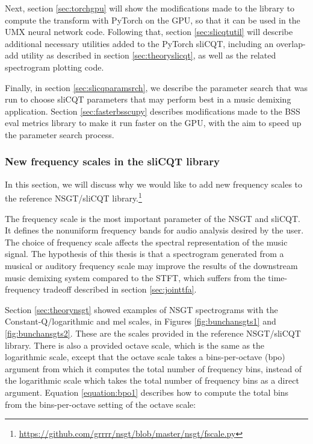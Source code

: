 \documentclass[report.tex]{subfiles}
\begin{document}
Next, section \ref{sec:torchgpu} will show the modifications made to the library to compute the transform with PyTorch on the GPU, so that it can be used in the UMX neural network code. Following that, section \ref{sec:slicqtutil} will describe additional necessary utilities added to the PyTorch sliCQT, including an overlap-add utility as described in section \ref{sec:theoryslicqt}, as well as the related spectrogram plotting code.

Finally, in section \ref{sec:slicqparamsrch}, we describe the parameter search that was run to choose sliCQT parameters that may perform best in a music demixing application. Section \ref{sec:fasterbsscupy} describes modifications made to the BSS eval metrics library to make it run faster on the GPU, with the aim to speed up the parameter search process.

\subsubsection{New frequency scales in the sliCQT library}
\label{sec:improvelib}

In this section, we will discuss why we would like to add new frequency scales to the reference NSGT/sliCQT library.\footnote{\url{https://github.com/grrrr/nsgt/blob/master/nsgt/fscale.py}}

The frequency scale is the most important parameter of the NSGT and sliCQT. It defines the nonuniform frequency bands for audio analysis desired by the user. The choice of frequency scale affects the spectral representation of the music signal. The hypothesis of this thesis is that a spectrogram generated from a musical or auditory frequency scale may improve the results of the downstream music demixing system compared to the STFT, which suffers from the time-frequency tradeoff described in section \ref{sec:jointtfa}.

Section \ref{sec:theorynsgt} showed examples of NSGT spectrograms with the Constant-Q/logarithmic and mel scales, in Figures \ref{fig:bunchansgts1} and \ref{fig:bunchansgts2}. These are the scales provided in the reference NSGT/sliCQT library. There is also a provided octave scale, which is the same as the logarithmic scale, except that the octave scale takes a bins-per-octave (bpo) argument from which it computes the total number of frequency bins, instead of the logarithmic scale which takes the total number of frequency bins as a direct argument. Equation \eqref{equation:bpo1} describes how to compute the total bins from the bins-per-octave setting of the octave scale:
\end{document}
